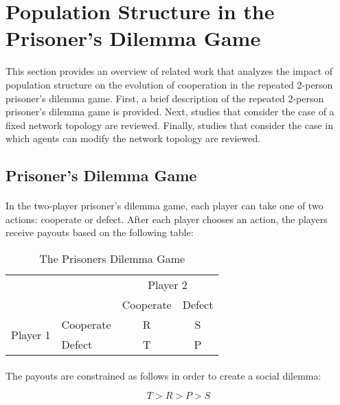 \documentclass{article}
\begin{document}
    \section{Population Structure in the Prisoner's Dilemma Game}
    This section provides an overview of related work that analyzes the impact of population structure on the evolution of cooperation in the repeated 2-person prisoner's dilemma game.  First, a brief description of the repeated 2-person prisoner's dilemma game is provided.  Next, studies that consider the case of a fixed network topology are reviewed.  Finally, studies that consider the case in which agents can modify the network topology are reviewed.
    
    \subsection{Prisoner's Dilemma Game}
    \paragraph{}In the two-player prisoner's dilemma game, each player can take one of two actions: cooperate or defect.  After each player chooses an action, the players receive payouts based on the following table:
    
    \begin{table}[h!]
      \begin{center}
      \begin{tabular}{llcc}
    	\toprule
		&	&	\multicolumn{2}{c}{Player 2} \\ \cmidrule{3-4}
		&   & 	Cooperate & Defect  \\ \midrule
    	\multirow{2}{*}{Player 1}
    		& Cooperate   & R  & S  \\
    		& Defect  	  & T  & P \\ \bottomrule
      \end{tabular}
      \caption{The Prisoners Dilemma Game}
	  \end{center}
    \end{table}

    \paragraph{}The payouts are constrained as follows in order to create a social dilemma:
    
    \begin{equation}
    	T > R > P > S
    \end{equation}
    
\end{document}
